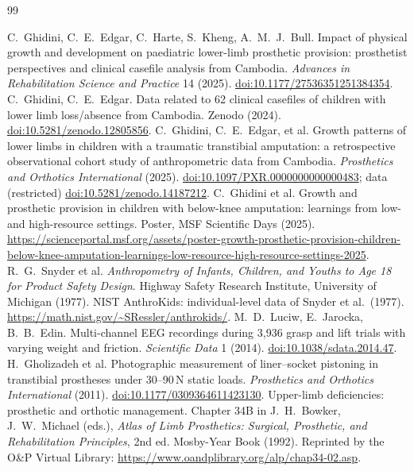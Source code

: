 \documentclass[11pt]{article}
\theoremstyle{definition}
\begin{document}
\begin{thebibliography}{99}
\small
{} C.~Ghidini, C.~E.~Edgar, C.~Harte, S.~Kheng, A.~M.~J.~Bull. Impact of physical growth and development on paediatric lower-limb prosthetic provision: prosthetist perspectives and clinical casefile analysis from Cambodia. \emph{Advances in Rehabilitation Science and Practice} 14 (2025). \href{https://doi.org/10.1177/27536351251384354}{doi:10.1177/27536351251384354}.
 C.~Ghidini, C.~E.~Edgar. Data related to 62 clinical casefiles of children with lower limb loss/absence from Cambodia. Zenodo (2024). \href{https://doi.org/10.5281/zenodo.12805856}{doi:10.5281/zenodo.12805856}.
 C.~Ghidini, C.~E.~Edgar, et al. Growth patterns of lower limbs in children with a traumatic transtibial amputation: a retrospective observational cohort study of anthropometric data from Cambodia. \emph{Prosthetics and Orthotics International} (2025). \href{https://doi.org/10.1097/PXR.0000000000000483}{doi:10.1097/PXR.0000000000000483}; data (restricted) \href{https://doi.org/10.5281/zenodo.14187212}{doi:10.5281/zenodo.14187212}.
 C.~Ghidini et al. Growth and prosthetic provision in children with below-knee amputation: learnings from low- and high-resource settings. Poster, MSF Scientific Days (2025). \url{https://scienceportal.msf.org/assets/poster-growth-prosthetic-provision-children-below-knee-amputation-learnings-low-resource-high-resource-settings-2025}.
 R.~G.~Snyder et al. \emph{Anthropometry of Infants, Children, and Youths to Age 18 for Product Safety Design}. Highway Safety Research Institute, University of Michigan (1977).
 NIST AnthroKids: individual-level data of Snyder et al.\ (1977). \url{https://math.nist.gov/~SRessler/anthrokids/}.
 M.~D.~Luciw, E.~Jarocka, B.~B.~Edin. Multi-channel EEG recordings during 3,936 grasp and lift trials with varying weight and friction. \emph{Scientific Data} 1 (2014). \href{https://doi.org/10.1038/sdata.2014.47}{doi:10.1038/sdata.2014.47}.
 H.~Gholizadeh et al. Photographic measurement of liner--socket pistoning in transtibial prostheses under 30--90\,N static loads. \emph{Prosthetics and Orthotics International} (2011). \href{https://doi.org/10.1177/0309364611423130}{doi:10.1177/0309364611423130}.
 Upper-limb deficiencies: prosthetic and orthotic management. Chapter 34B in J.~H.~Bowker, J.~W.~Michael (eds.), \emph{Atlas of Limb Prosthetics: Surgical, Prosthetic, and Rehabilitation Principles}, 2nd ed. Mosby-Year Book (1992). Reprinted by the O\&P Virtual Library: \url{https://www.oandplibrary.org/alp/chap34-02.asp}.

\end{thebibliography}
\end{document}
